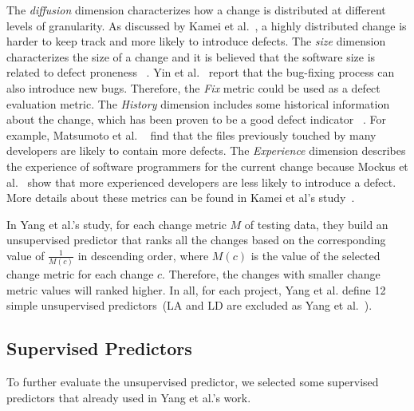 \documentclass[sigconf]{acmart}
\theoremstyle{break}
\begin{document}
The {\it diffusion} dimension characterizes how a change is 
distributed at different levels of granularity.
As discussed by Kamei et al.~\cite{kamei2013large},
a highly distributed change is harder to keep track
and more likely to introduce defects. The {\it size} dimension
characterizes the size of a change and it is believed that
the software size is related to defect proneness
~\cite{nagappan2005use,koru2009investigation}. Yin et al.~\cite{yin2011fixes}
report that the bug-fixing process can also introduce new bugs. 
Therefore, the {\it Fix} metric could be used as a defect evaluation metric.
The {\it History} dimension includes some historical information
about the change, which has been proven to be a good defect indicator ~\cite{matsumoto2010analysis}.
For example, Matsumoto et al. ~\cite{matsumoto2010analysis} find that the files
previously touched by many developers are likely to contain more defects.
The {\it Experience} dimension describes the experience of software programmers
for the current change because Mockus et al.~\cite{mockus2000predicting} show that
more experienced developers are less likely to introduce a defect. More details
about these metrics can be found in Kamei et al's study~\cite{kamei2013large}.



In Yang et al.'s study, for each change metric $M$ of testing data, 
they build an unsupervised predictor that ranks all the changes
based on the corresponding value of $\frac{1}{M(c)}$ in descending order, 
where $M(c)$ is the value of the selected change metric for each change $c$.
Therefore, the changes with smaller change metric values will ranked higher.
In all,  for each project, Yang et al. define  12 simple
unsupervised predictors~(LA and LD are excluded as Yang et al.~\cite{yang2016effort}).
 
 

\subsection{Supervised Predictors}
To further evaluate the unsupervised predictor, we selected some supervised predictors
that already used in Yang et al.'s work. 
\end{document}
